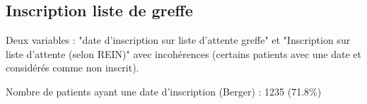 \documentclass[11pt,a4paper]{article}\usepackage[]{graphicx}\usepackage[]{color}
\begin{document}
% 

  \subsection{Inscription liste de greffe}

Deux variables : "date d'inscription sur liste d'attente greffe" et "Inscription sur liste d'attente (selon REIN)" avec incohérences (certains patients avec une date et considérés comme non inscrit).

Nombre de patients ayant une date d'inscription (Berger) : 1235 (71.8\%)
\end{document}
